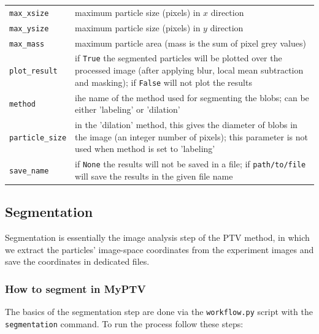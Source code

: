 \documentclass[10pt,a4paper]{article}
\begin{document}
\begin{table}[!ht]
\begin{tabular}{l m{13cm}}
		\texttt{max\_xsize} & maximum particle size (pixels) in $x$ direction \\[.3em]
		
		\texttt{max\_ysize} & maximum particle size (pixels) in $y$ direction \\[.3em]
		
		\texttt{max\_mass} & maximum particle area (mass is the sum of pixel grey values) \\[.3em]
		
		\texttt{plot\_result} & if \texttt{True} the segmented particles will be plotted over the processed image (after applying blur, local mean subtraction and masking); if \texttt{False} will not plot the results \\[.3em]
		
		\texttt{method} & ihe name of the method used for segmenting the blobs; can be either 'labeling' or 'dilation' \\
		
		\texttt{particle\_size} & in the 'dilation' method, this gives the diameter of blobs in the image (an integer number of pixels); this parameter is not used when method is set to 'labeling' \\
		
		\texttt{save\_name} & if \texttt{None} the results will not be saved in a file; if \texttt{path/to/file} will save the results in the given file name \\
		
		\hline
	\end{tabular}
\end{table}




\subsection{Segmentation}\label{sec:workflow_segment}


Segmentation is essentially the image analysis step of the PTV method, in which we extract the particles' image-space coordinates from the experiment images and save the coordinates in dedicated files. 


\subsubsection{How to segment in MyPTV}

The basics of the segmentation step are done via the \texttt{workflow.py} script with the \texttt{segmentation} command. To run the process follow these steps:
\end{document}
